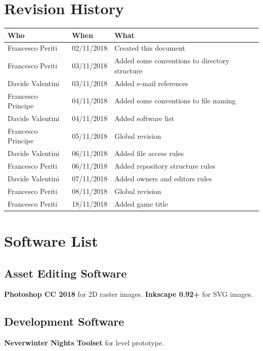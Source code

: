 \documentclass[12pt]{article}
\begin{document}
\clearpage

\section*{Revision History}
\begin{table}[H]
\centering
  \begin{tabularx}{\textwidth}{|l|l|X|}
\hline
\cellcolor{lightgray}\textbf{Who} & \cellcolor{lightgray}\textbf{When} & \cellcolor{lightgray}\textbf{What} \\ \hline
Francesco Periti & 02/11/2018 & Created this document \\ \hline
Francesco Periti & 03/11/2018 & Added some conventions to directory structure \\ \hline
Davide Valentini & 03/11/2018 & Added e-mail references \\ \hline
Francesco Principe & 04/11/2018 & Added some conventions to file naming \\ \hline
Davide Valentini & 04/11/2018 & Added software list \\ \hline
Francesco Principe & 05/11/2018 & Global revision \\ \hline
Davide Valentini & 06/11/2018 & Added file access rules \\ \hline
Francesco Periti & 06/11/2018 & Added repository structure rules \\ \hline
Davide Valentini & 07/11/2018 & Added owners and editors rules \\ \hline
Francesco Periti & 08/11/2018 & Global revision \\ \hline
Francesco Periti & 18/11/2018 & Added game title \\ \hline
\end{tabularx}
\end{table}

\clearpage

\section{Software List}

\subsection{Asset Editing Software}
\textbf{Photoshop CC 2018} for 2D raster images.
\textbf{Inkscape 0.92+} for SVG images.

\subsection{Development Software}
\textbf{Neverwinter Nights Toolset} for level prototype.
\end{document}
